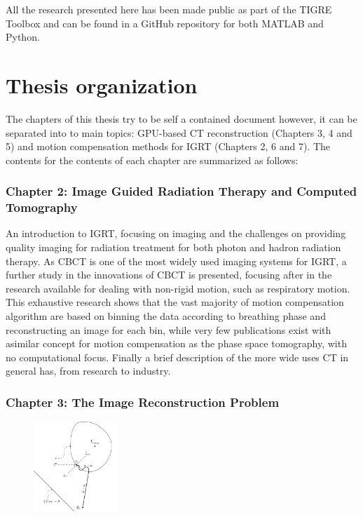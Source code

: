 All the research presented here has been made public as part of the TIGRE Toolbox\cite{TIGRE} and can be found in a GitHub repository\cite{TIGREweb} for both MATLAB and Python. 

\section{Thesis organization}

The chapters of this thesis try to be self a contained document however, it can be separated into to main topics: GPU-based CT reconstruction (Chapters 3, 4 and 5) and motion compensation methods for IGRT (Chapters 2, 6 and 7). The contents for the contents of each chapter are summarized as follows:

\subsubsection{Chapter 2: Image Guided Radiation Therapy and Computed Tomography}

An introduction to IGRT, focusing on imaging and the challenges on providing quality imaging for radiation treatment for both photon and hadron radiation therapy. As CBCT is one of the most widely used imaging systems for IGRT, a further study in the innovations of CBCT is presented, focusing after in the research available for dealing with non-rigid motion, such as respiratory motion. This exhaustive research shows that the vast majority of motion compensation algorithm are based on binning the data according to breathing phase and reconstructing an image for each bin, while very few publications exist with asimilar concept for motion compensation as the phase space tomography, with no computational focus. Finally a brief description of the more wide uses CT in general has, from research to industry.

\subsubsection{Chapter 3: The Image Reconstruction Problem}

\begin{figure}
\centering
\includegraphics[width=0.28\textwidth]{RecAlgorithms/POCS.pdf}
\end{figure}

